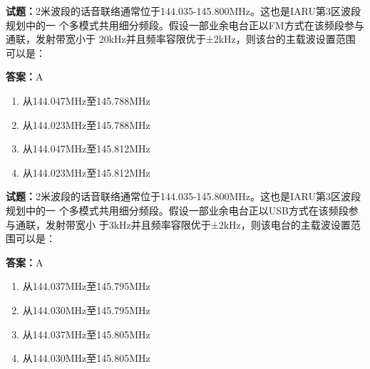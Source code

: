 \documentclass{ctexbook}
\begin{document}



\vspace{1em}

\textbf{试题：}2米波段的话音联络通常位于144.035-145.800MHz。这也是IARU第3区波段规划中的一
个多模式共用细分频段。假设一部业余电台正以FM方式在该频段参与通联，发射带宽小于
20kHz并且频率容限优于±2kHz，则该台的主载波设置范围可以是： 

\textbf{答案：}A 

\begin{enumerate}[leftmargin=3em]
  \item 从144.047MHz至145.788MHz 

  \item 从144.023MHz至145.788MHz 

  \item 从144.047MHz至145.812MHz 

  \item 从144.023MHz至145.812MHz 

\end{enumerate}





\vspace{1em}

\textbf{试题：}2米波段的话音联络通常位于144.035-145.800MHz。这也是IARU第3区波段规划中的一
个多模式共用细分频段。假设一部业余电台正以USB方式在该频段参与通联，发射带宽小
于3kHz并且频率容限优于±2kHz，则该电台的主载波设置范围可以是： 

\textbf{答案：}A 

\begin{enumerate}[leftmargin=3em]
  \item 从144.037MHz至145.795MHz 

  \item 从144.030MHz至145.795MHz 

  \item 从144.037MHz至145.805MHz 

  \item 从144.030MHz至145.805MHz 

\end{enumerate}





\vspace{1em}
\end{document}

